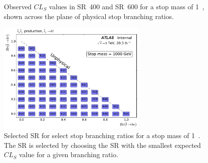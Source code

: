 \begin{figure}[ht]
  \centering
  \caption{
    Observed $CL_S$ values in SR~400 and SR~600 for a stop mass of 1~\TeV,
    shown across the plane of physical stop branching ratios.
  }
\end{figure}

\begin{figure}[ht]
  \centering
  \includegraphics[width=0.65\textwidth]
    {figs/blstop/region_selection/region_choice_vs_br_m_1000.pdf}
  \caption{
    Selected SR for select stop branching ratios for a stop mass of 1~\TeV.
    The SR is selected by choosing the SR with the smallest expected $CL_S$
    value for a given branching ratio.
  }
\end{figure}

